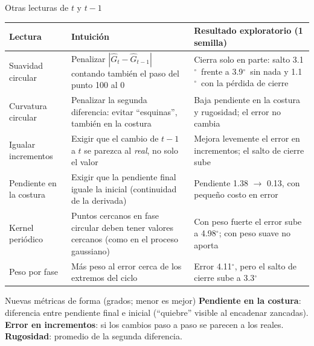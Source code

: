 \documentclass[aspectratio=169,10pt,t]{beamer}
\newcommand{\gr}{$^\circ$}
\begin{document}
\begin{frame}{Otras lecturas de $t$ y $t-1$}
\scriptsize
\renewcommand{\arraystretch}{1.15}
\begin{tabularx}{\textwidth}{@{}>{\raggedright\arraybackslash}p{2.7cm}>{\raggedright\arraybackslash}X>{\raggedright\arraybackslash}p{5.1cm}@{}}
\toprule
\textbf{Lectura} & \textbf{Intuición} & \textbf{Resultado exploratorio (1 semilla)}\\
\midrule
Suavidad circular & Penalizar $|\hat G_t-\hat G_{t-1}|$ contando también el paso del punto 100 al 0 & Cierra solo en parte: salto 3.1\gr\ frente a 3.9\gr\ sin nada y 1.1\gr\ con la pérdida de cierre\\
Curvatura circular & Penalizar la segunda diferencia: evitar ``esquinas'', también en la costura & Baja pendiente en la costura y rugosidad; el error no cambia\\
Igualar incrementos & Exigir que el cambio de $t-1$ a $t$ se parezca al \emph{real}, no solo el valor & Mejora levemente el error en incrementos; el salto de cierre sube\\
Pendiente en la costura & Exigir que la pendiente final iguale la inicial (continuidad de la derivada) & Pendiente 1.38 $\to$ 0.13, con pequeño costo en error\\
Kernel periódico & Puntos cercanos en fase circular deben tener valores cercanos (como en el proceso gaussiano) & Con peso fuerte el error sube a 4.98\gr; con peso suave no aporta\\
Peso por fase & Más peso al error cerca de los extremos del ciclo & Error 4.11\gr, pero el salto de cierre sube a 3.3\gr\\
\bottomrule
\end{tabularx}

\vspace{6pt}
\normalsize
\begin{block}{Nuevas métricas de forma (grados; menor es mejor)}\scriptsize
\textbf{Pendiente en la costura}: diferencia entre pendiente final e inicial (``quiebre'' visible al encadenar zancadas). \textbf{Error en incrementos}: si los cambios paso a paso se parecen a los reales. \textbf{Rugosidad}: promedio de la segunda diferencia.
\end{block}
\end{frame}
\end{document}
